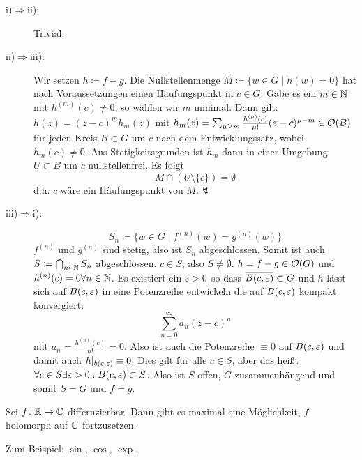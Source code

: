 \begin{beweis}
	\begin{description}
		\item[i)$ \Rightarrow $ii):] Trivial.
		\item[ii)$ \Rightarrow $iii):] Wir setzen $ h\coloneqq f-g $. Die Nullstellenmenge $ M\coloneqq\lbrace w\in G\mid h(w)=0\rbrace $ hat nach Voraussetzungen einen H\"aufungspunkt in $ c\in G $. G\"abe es ein $ m\in\mathbb{N} $ mit $ h^{(m)}(c)\neq 0 $, so w\"ahlen wir $ m $ minimal. Dann gilt: $ h(z)=(z-c)^m h_m(z) $ mit $ h_m(z)=\sum_{\mu\geq m}^{}\frac{h^{(\mu)}(c)}{\mu!}(z-c)^{\mu-m}\in\mathcal O(B) $ f\"ur jeden Kreis $ B\subset G $ um $ c $ nach dem Entwicklungssatz, wobei $ h_m(c)\neq 0 $. Aus Stetigkeitsgrunden ist $ h_m $ dann in einer Umgebung $ U\subset B $ um $ c $ nullstellenfrei. Es folgt
		\[ M\cap(U\setminus\lbrace c\rbrace)=\emptyset \]
		d.h. $ c $ w\"are ein H\"aufungspunkt von $ M $.$ \lightning $
		\item[iii)$ \Rightarrow $i):] \[ S_n\coloneqq\lbrace w\in G\mid f^{(n)}(w)=g^{(n)}(w)\rbrace \]
		$ f^{(n)} $ und $ g^{(n)} $ sind stetig, also ist $ S_n $ abgeschlossen. Somit ist auch $ S\coloneqq\bigcap_{n\in\mathbb{N}}S_n $ abgeschlossen. $ c\in S $, also $ S\neq\emptyset $. $ h=f-g\in\mathcal O(G) $ und $ h^{(n)}(c)=0\forall n\in\mathbb{N} $. Es existiert ein $ \varepsilon>0 $ so dass $ \overline{B(c,\varepsilon)}\subset G $ und $ h $ l\"asst sich auf $ B(c,\varepsilon) $ in eine Potenzreihe entwickeln die auf $ B(c,\varepsilon) $ kompakt konvergiert:
		\[ \sum_{n=0}^{\infty}a_n(z-c)^n \]
		mit $ a_n=\frac{h^{(n)}(c)}{n!}=0 $. Also ist auch die Potenzreihe $ \equiv 0 $ auf $ B(c,\varepsilon) $ und damit auch $ h|_{b(c,\varepsilon)}\equiv 0 $. Dies gilt f\"ur alle $ c\in S $, aber das hei\ss t $ \forall c\in S\exists \varepsilon>0: B(c,\varepsilon)\subset S $. Also ist $ S $ offen, $ G $ zusammenh\"angend und somit $ S=G $ und $ f=g $.
	\end{description}
\end{beweis}
\begin{korollar}
	Sei $ f\colon\mathbb{R}\rightarrow\mathbb{C} $ differnzierbar. Dann gibt es maximal eine M\"oglichkeit, $ f $ holomorph auf $ \mathbb{C} $ fortzusetzen.
\end{korollar}
Zum Beispiel: $ \sin $, $ \cos $, $ \exp $.
